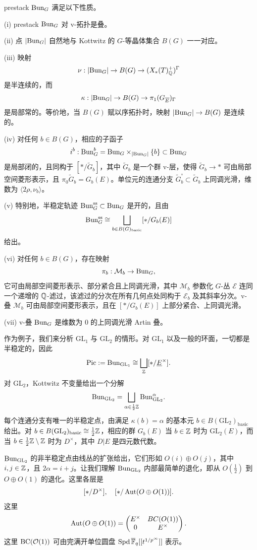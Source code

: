 \begin{theorem}%
prestack $\mathrm{Bun}_G$ 满足以下性质。

\noindent (i) prestack $\mathrm{Bun}_G$ 对 v-拓扑是叠。

\noindent (ii) 点 $|\mathrm{Bun}_G|$ 自然地与 Kottwitz 的 $G$-等晶体集合 $B(G)$ 一一对应。

\noindent{}(iii) 映射
\[
  \nu : |\mathrm{Bun}_G|\to B(G)\to(X_*(T)^+_{\mathbb{Q}})^\Gamma
\]
是半连续的，而
\[
  \kappa : |\mathrm{Bun}_G|\to B(G)\to\pi_1(G_{\overline{E}})_\Gamma
\]
是局部常的。等价地，当 $B(G)$ 赋以序拓扑时，映射 $|\mathrm{Bun}_G|\to B(G)$ 是连续的。

\noindent (iv) 对任何 $b\in B(G)$，相应的子函子
\[
  i^b : \mathrm{Bun}_G^b = \mathrm{Bun}_G\times_{|\mathrm{Bun}_G|}\{b\}\subset\mathrm{Bun}_G
\]
是局部闭的，且同构于 $[\ast/\widetilde{G}_b]$，其中 $\widetilde{G}_b$ 是一个群 v-层，使得 $\widetilde{G}_b\to\ast$ 可由局部空间菱形表示，且 $\pi_0\widetilde{G}_b=G_b(E)$。单位元的连通分支 $\widetilde{G}_b^\circ\subset\widetilde{G}_b$ 上同调光滑，维数为 $\langle2\rho,\nu_b\rangle$。

\noindent (v) 特别地，半稳定轨迹 $\mathrm{Bun}_G^{\mathrm{ss}}\subset\mathrm{Bun}_G$ 是开的，且由
\[
  \mathrm{Bun}_G^{\mathrm{ss}} \cong \bigsqcup_{b\in B(G)_{\mathrm{basic}}}[\ast/G_b(E)]
\]
给出。

\noindent (vi) 对任何 $b\in B(G)$，存在映射
\[
  \pi_b : \mathcal{M}_b\to\mathrm{Bun}_G,
\]
它可由局部空间菱形表示、部分紧合且上同调光滑，其中 $\mathcal{M}_b$ 参数化 $G$-丛 $\mathcal{E}$ 连同一个递增的 $\mathbb{Q}$-滤过，该滤过的分次在所有几何点处同构于 $\mathcal{E}_b$ 及其斜率分次。v-叠 $\mathcal{M}_b$ 可由局部空间菱形表示，且在 $[\ast/G_b(E)]$ 上部分紧合、上同调光滑。

\noindent (vii) v-叠 $\mathrm{Bun}_G$ 是维数为 $0$ 的上同调光滑 Artin 叠。
\end{theorem}

作为例子，我们来分析 $\mathrm{GL}_1$ 与 $\mathrm{GL}_2$ 的情形。对 $\mathrm{GL}_1$ 以及一般的环面，一切都是半稳定的，因此
\[
  \mathrm{Pic} := \mathrm{Bun}_{\mathrm{GL}_1}\cong\bigsqcup_{\mathbb{Z}}[\ast/\underline{E}^\times].
\]
对 $\mathrm{GL}_2$，Kottwitz 不变量给出一个分解
\[
  \mathrm{Bun}_{\mathrm{GL}_2} = \bigsqcup_{\alpha\in\frac12\mathbb{Z}}\mathrm{Bun}_{\mathrm{GL}_2}^\alpha.
\]
每个连通分支有唯一的半稳定点，由满足 $\kappa(b)=\alpha$ 的基本元 $b\in B(\mathrm{GL}_2)_{\mathrm{basic}}$ 给出。对 $b\in B(\mathrm{GL}_2)_{\mathrm{basic}}\cong\frac12\mathbb{Z}$，相应的群 $G_b(E)$ 当 $b\in\mathbb{Z}$ 时为 $\mathrm{GL}_2(E)$，而当 $b\in\frac12\mathbb{Z}\setminus\mathbb{Z}$ 时为 $D^\times$，其中 $D|E$ 是四元数代数。

$\mathrm{Bun}_{\mathrm{GL}_2}$ 的非半稳定点由线丛的扩张给出，它们形如 $O(i)\oplus O(j)$，其中 $i,j\in\mathbb{Z}$，且 $2\alpha=i+j$。让我们理解 $\mathrm{Bun}_{\mathrm{GL}_2}$ 内部最简单的退化，即从 $O(\frac12)$ 到 $O\oplus O(1)$ 的退化。这里各层是
\[
  [\ast/D^\times],\quad [\ast/\operatorname{Aut}(O\oplus O(1))].
\]
这里
\[
  \operatorname{Aut}(O\oplus O(1)) = \begin{pmatrix} E^\times & BC(O(1))\\ 0 & E^\times\end{pmatrix}.
\]
这里 $\mathrm{BC}(\mathcal{O}(1))$ 可由完满开单位圆盘 $\mathrm{Spd}\,\overline{\mathbb{F}}_q[[t^{1/p^\infty}]]$ 表示。

